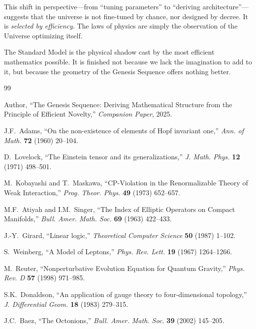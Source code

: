 \documentclass[12pt,a4paper]{article}
\theoremstyle{definition}
\begin{document}
This shift in perspective—from ``tuning parameters'' to ``deriving architecture''—suggests that the universe is not fine-tuned by chance, nor designed by decree. It is \emph{selected by efficiency}. The laws of physics are simply the observation of the Universe optimizing itself.

The Standard Model is the physical shadow cast by the most efficient mathematics possible. It is finished not because we lack the imagination to add to it, but because the geometry of the Genesis Sequence offers nothing better.


\begin{thebibliography}{99}

Author, ``The Genesis Sequence: Deriving Mathematical Structure from the Principle of Efficient Novelty,'' \emph{Companion Paper}, 2025.

J.F.~Adams, ``On the non-existence of elements of Hopf invariant one,'' \emph{Ann. of Math.} \textbf{72} (1960) 20--104.

D.~Lovelock, ``The Einstein tensor and its generalizations,'' \emph{J. Math. Phys.} \textbf{12} (1971) 498--501.

M.~Kobayashi and T.~Maskawa, ``CP-Violation in the Renormalizable Theory of Weak Interaction,'' \emph{Prog. Theor. Phys.} \textbf{49} (1973) 652--657.

M.F.~Atiyah and I.M.~Singer, ``The Index of Elliptic Operators on Compact Manifolds,'' \emph{Bull. Amer. Math. Soc.} \textbf{69} (1963) 422--433.

J.-Y.~Girard, ``Linear logic,'' \emph{Theoretical Computer Science} \textbf{50} (1987) 1--102.

S.~Weinberg, ``A Model of Leptons,'' \emph{Phys. Rev. Lett.} \textbf{19} (1967) 1264--1266.

M.~Reuter, ``Nonperturbative Evolution Equation for Quantum Gravity,'' \emph{Phys. Rev. D} \textbf{57} (1998) 971--985.

S.K.~Donaldson, ``An application of gauge theory to four-dimensional topology,'' \emph{J. Differential Geom.} \textbf{18} (1983) 279--315.

J.C.~Baez, ``The Octonions,'' \emph{Bull. Amer. Math. Soc.} \textbf{39} (2002) 145--205.

\end{thebibliography}
\end{document}
